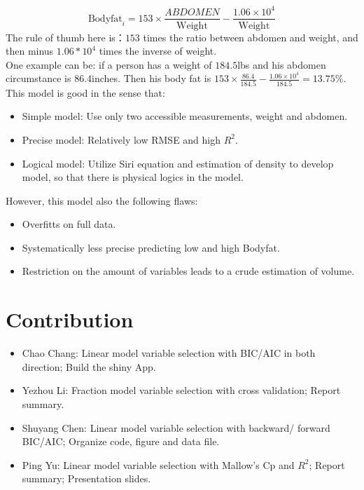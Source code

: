 \documentclass[11pt, twocolumn]{article}
\begin{document}
$$\text{Bodyfat}_i = 153 \times \frac{ABDOMEN}{ \text{Weight} }
				 - \frac{1.06 \times 10^4}{ \text{Weight} }$$
The rule of thumb here is：$153$ times the ratio between abdomen and weight, and then minus $1.06*10^4$ times the inverse of weight.\\
One example can be: if a person has a weight of $184.5$lbs and his abdomen circumstance is $86.4$inches. Then his body fat is $153 \times \frac{86.4}{184.5} - \frac{1.06\times 10^4}{184.5}=13.75\%$.\\
This model is good in the sense that: 
\begin{itemize}
	\item Simple model: Use only two accessible measurements, weight and abdomen. 
	\item Precise model: Relatively low RMSE and high $R^2$.
	\item Logical model: Utilize Siri equation and estimation of density to develop model, so that there is physical logics in the model. 
\end{itemize}

However, this model also the following flaws: 

\begin{itemize}
	\item Overfitts on full data. 
	\item Systematically less precise predicting low and high Bodyfat. 
	\item Restriction on the amount of variables leads to a crude estimation of volume. 
\end{itemize}




\section{Contribution}

\begin{itemize}
	\item Chao Chang: Linear model variable selection with BIC/AIC in both direction; Build the shiny App.
	\item Yezhou Li: Fraction model variable selection with cross validation; Report summary.
	\item Shuyang Chen: Linear model variable selection with backward/ forward BIC/AIC; Organize code, figure and data file.
	\item Ping Yu: Linear model variable selection with Mallow's Cp and $R^2$; Report summary; Presentation slides.
\end{itemize}
\end{document}
